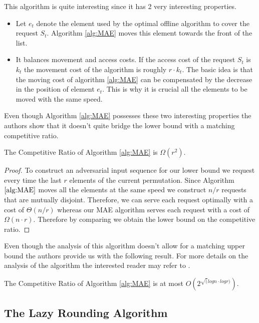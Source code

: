 This algorithm is quite interesting since it has 2 very interesting properties.

\begin{itemize}
    \item Let $e_t$ denote the element used by the optimal offline algorithm to cover the request $S_t$. Algorithm \ref{alg:MAE} moves this element towards the front of the list.
    \item It balances movement and access costs. If the access cost of the request $S_t$ is $k_t$ the movement cost of the algorithm is roughly $r \cdot k_t$. The basic idea is that the moving cost of algorithm \ref{alg:MAE} can be compensated by the decrease in the position of element $e_t$. This is why it is crucial all the elements to be moved with the same speed.
\end{itemize} 

Even though Algorithm \ref{alg:MAE} possesses these two interesting properties the authors show that it doesn't quite bridge the lower bound with a matching competitive ratio.

\begin{lemma}
    The Competitive Ratio of Algorithm \ref{alg:MAE} is $\Omega( r^2 )$.
\end{lemma}

\begin{proof}
    To construct an adversarial input sequence for our lower bound we request every time the last $r$ elements of the current permutation. Since Algorithm $\ref{alg:MAE}$ moves all the elements at the same speed we construct $n/r$ requests that are mutually disjoint. Therefore, we can serve each request optimally with a cost of $\Theta(n/r)$ whereas our MAE algorithm serves each request with a cost of $\Omega(n \cdot r)$. Therefore by comparing we obtain the lower bound on the competitive ratio.
\end{proof}

Even though the analysis of this algorithm doesn't allow for a matching upper bound the authors provide us with the following result. For more details on the analysis of the algorithm the interested reader may refer to \cite{FKKSV20}.

\begin{lemma}
    The Competitive Ratio of Algorithm \ref{alg:MAE} is at most $O( 2^{\sqrt( logn \cdot logr ) } ).$
\end{lemma}

\subsection{The Lazy Rounding Algorithm}

